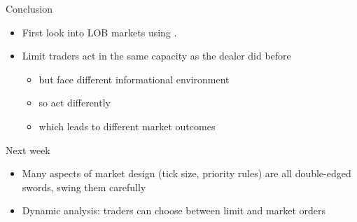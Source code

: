 \documentclass[english,10pt
,aspectratio=169
]{beamer}
\begin{document}


\begin{frame}{Conclusion}
	\begin{itemize}
		\item First look into LOB markets using \cite{glosten_is_1994}.
		\item Limit traders act in the same capacity as the dealer did before
		\begin{itemize}
			\item but face different informational environment
			\item so act differently
			\item which leads to different market outcomes
		\end{itemize}
	\end{itemize}
\end{frame}


\begin{frame}{Next week}
	\begin{itemize}
		\item Many aspects of market design (tick size, priority rules) are all double-edged swords, swing them carefully
		\item Dynamic analysis: traders can choose between limit and market orders
	\end{itemize}
\end{frame}
\end{document}
